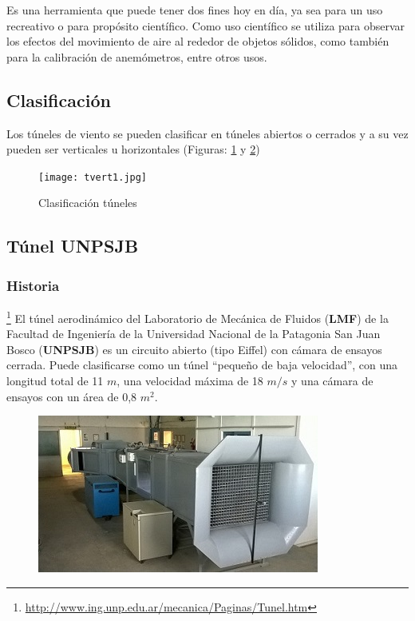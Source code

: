 


\begin{tcolorbox}[colback=blue!5!white,colframe=blue!75!black,title=Túnel de viento]
Es una herramienta que puede tener dos fines hoy en día, ya sea para un uso recreativo o para propósito científico.
Como uso científico se utiliza para observar los efectos del movimiento de aire al rededor de objetos sólidos, como también para la calibración de anemómetros, entre otros usos.
\end{tcolorbox}


\subsection{Clasificación}
Los túneles de viento se pueden clasificar en túneles abiertos o cerrados y a su vez pueden ser verticales u horizontales (Figuras: \ref{fig:tunelRec} y \ref{fig:abierto})


\begin{figure}[htb]
	\centering
	\texttt{[image: tvert1.jpg]}
	\label{fig:tunelRec}
\end{figure}

\begin{figure}[htbp]
    \centering
    \caption{Clasificación túneles} \label{fig:abierto}
    \end{figure}


\subsection{Túnel UNPSJB}

\subsubsection{Historia}
\footnote{\url{http://www.ing.unp.edu.ar/mecanica/Paginas/Tunel.htm}} 
	El túnel aerodinámico del Laboratorio de Mecánica de Fluidos (\textbf{LMF}) de la Facultad de Ingeniería de la Universidad Nacional de la Patagonia San Juan Bosco (\textbf{UNPSJB}) es un circuito abierto (tipo Eiffel) con cámara de ensayos cerrada. Puede clasificarse como un túnel “pequeño de baja velocidad”, con una longitud total de 11 $m$, una velocidad máxima de 18 $m/s$ y una cámara de ensayos con un área de 0,8 $m^2$.
	
	\begin{figure}[htb]
		\centering
		\includegraphics[scale=0.9]{tunel_unpsjb.JPG}
		\label{fig:tunelUni}
	\end{figure}
	
